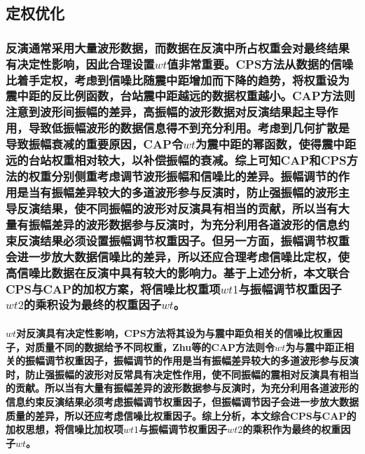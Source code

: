 \documentclass[a4paper,12pt,single,pdftex]{scrartcl}
\begin{document}
\label{ID_1003053734}\subsection{定权优化}

\label{ID_975012270}\subsubsection{反演通常采用大量波形数据，而数据在反演中所占权重会对最终结果有决定性影响，因此合理设置$wt$值非常重要。CPS方法从数据的信噪比着手定权，考虑到信噪比随震中距增加而下降的趋势，将权重设为震中距的反比例函数，台站震中距越远的数据权重越小。CAP方法\cite{Zhu1996}则注意到波形间振幅的差异，高振幅的波形数据对反演结果起主导作用，导致低振幅波形的数据信息得不到充分利用。考虑到几何扩散是导致振幅衰减的重要原因，CAP令$wt$为震中距的幂函数，使得震中距远的台站权重相对较大，以补偿振幅的衰减。综上可知CAP和CPS方法的权重分别侧重考虑调节波形振幅和信噪比的差异。振幅调节的作用是当有振幅差异较大的多道波形参与反演时，防止强振幅的波形主导反演结果，使不同振幅的波形对反演具有相当的贡献，所以当有大量有振幅差异的波形数据参与反演时，为充分利用各道波形的信息约束反演结果必须设置振幅调节权重因子。但另一方面，振幅调节权重会进一步放大数据信噪比的差异，所以还应合理考虑信噪比定权，使高信噪比数据在反演中具有较大的影响力。基于上述分析，本文联合CPS与CAP的加权方案，将信噪比权重项$wt1$与振幅调节权重因子$wt2$的乘积设为最终的权重因子$wt$。}

\label{ID_1260250456}\paragraph{$wt$对反演具有决定性影响，CPS方法将其设为与震中距负相关的信噪比权重因子，对质量不同的数据给予不同权重，Zhu等\cite{Zhu1996}的CAP方法则令$wt$为与震中距正相关的振幅调节权重因子，振幅调节的作用是当有振幅差异较大的多道波形参与反演时，防止强振幅的波形对反常具有决定性作用，使不同振幅的震相对反演具有相当的贡献。所以当有大量有振幅差异的波形数据参与反演时，为充分利用各道波形的信息约束反演结果必须考虑振幅调节权重因子，但振幅调节因子会进一步放大数据质量的差异，所以还应考虑信噪比权重因子。综上分析，本文综合CPS与CAP的加权思想，将信噪比加权项$wt1$与振幅调节权重因子$wt2$的乘积作为最终的权重因子$wt$。}
\end{document}
